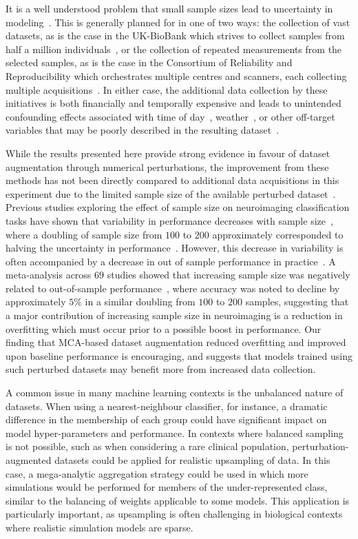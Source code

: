 \documentclass[10pt]{SelfArx} %
\begin{document}
It is a well understood problem that small sample sizes lead to uncertainty in modeling~\cite{varoquaux2018cross}.
This is generally planned for in one of two ways: the collection of vast datasets, as is the case in the UK-BioBank
which strives to collect samples from half a million individuals~\cite{sudlow2015uk}, or the collection of repeated
measurements from the selected samples, as is the case in the Consortium of Reliability and Reproducibility which
orchestrates multiple centres and scanners, each collecting multiple acquisitions~\cite{zuo2014open}. In either case,
the additional data collection by these initiatives is both financially and temporally expensive and leads to
unintended confounding effects associated with time of day~\cite{vandewalle2009functional},
weather~\cite{di2019estimations}, or other off-target variables that may be poorly described in the resulting
dataset~\cite{chaddock2010neuroimaging}.

While the results presented here provide strong evidence in favour of dataset augmentation through numerical
perturbations, the improvement from these methods has not been directly compared to additional data acquisitions in
this experiment due to the limited sample size of the available perturbed dataset~\cite{Kiar2020-yz}. Previous studies
exploring the effect of sample size on neuroimaging classification tasks have shown that variability in performance
decreases with sample size~\cite{chu2012does}, where a doubling of sample size from $100$ to $200$
approximately corresponded to halving the uncertainty in performance~\cite{varoquaux2018cross}. However, this decrease
in variability is often accompanied by a decrease in out of sample performance in practice~\cite{schnack2016detecting}.
A meta-analysis across $69$ studies showed that increasing sample size was negatively related to out-of-sample
performance~\cite{pulini2019classification}, where accuracy was noted to decline by approximately $5\%$ in a similar
doubling from $100$ to $200$ samples, suggesting that a major contribution of increasing sample size in neuroimaging
is a reduction in overfitting which must occur prior to a possible boost in performance. Our finding that MCA-based
dataset augmentation reduced overfitting and improved upon baseline performance is encouraging, and suggests that
models trained using such perturbed datasets may benefit more from increased data collection.

A common issue in many machine learning contexts is the unbalanced nature of datasets. When using a nearest-neighbour
classifier, for instance, a dramatic difference in the membership of each group could have significant impact on model
hyper-parameters and performance. In contexts where balanced sampling is not possible, such as when considering a rare
clinical population, perturbation-augmented datasets could be applied for realistic upsampling of data. In this case, a
mega-analytic aggregation strategy could be used in which more simulations would be performed for members of the
under-represented class, similar to the balancing of weights applicable to some models. This application is
particularly important, as upsampling is often challenging in biological contexts where realistic simulation models are
sparse.
\end{document}

